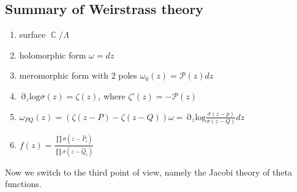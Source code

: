 \documentclass[12 pt]{article}
\DeclareMathOperator {\p} {\partial}
\DeclareMathOperator {\C} {\mathbb{C}}
\theoremstyle{plain}
\theoremstyle{definition}
\theoremstyle{remark}
\begin{document}
\subsection*{Summary of Weirstrass theory}
\begin{enumerate}
\item surface $\C/\Lambda$
\item holomorphic form $\omega = dz$
\item meromorphic form with 2 poles $\omega_0(z) = \mathcal{P}(z) dz$
\item $\p_z \text{log} \sigma(z) = \zeta(z)$, where $\zeta'(z)  = -\mathcal{P}(z)$
\item $\omega_{PQ} (z) = \left( \zeta(z-P) - \zeta(z-Q) \right) \omega = \p_z \text{log} \frac{\sigma(z-p)}{\sigma(z-Q)} dz$
\item $f(z) = \frac{\prod \sigma(z - \hat P_i)}{\prod \sigma(z - \hat Q_i) }    $
\end{enumerate}
Now we switch to the third point of view, namely the Jacobi theory of theta functions.
\end{document}
